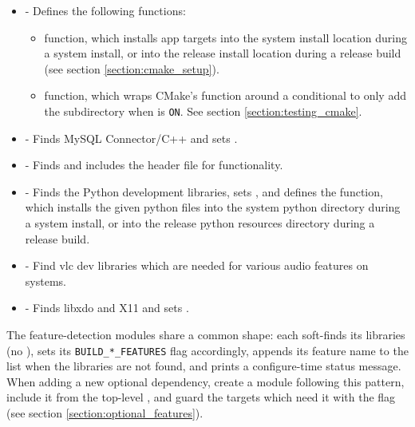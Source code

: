 \begin{itemize}\itemsep0em
	\item {} - Defines the following functions:
		\begin{itemize}\itemsep0em
			\item {} function, which installs app targets into the system install location during a system install, or into the release install location during a release build (see section \ref{section:cmake_setup}).
			\item {} function, which wraps CMake's  function around a conditional to only add the subdirectory when  is \texttt{ON}. See section \ref{section:testing_cmake}.
		\end{itemize}
	\item {} - Finds MySQL Connector/C++ and sets .
	\item {} - Finds and includes the  header file for  functionality.
	\item {} - Finds the Python development libraries, sets , and defines the  function, which installs the given python files into the system python directory during a system install, or into the release python resources directory during a release build.
	\item {} - Find vlc dev libraries which are needed for various audio features on  systems.
	\item {} - Finds libxdo and X11 and sets .
\end{itemize}

The feature-detection modules share a common shape: each soft-finds its libraries (no ), sets its \texttt{BUILD\_*\_FEATURES} flag accordingly, appends its feature name to the  list when the libraries are not found, and prints a configure-time status message. When adding a new optional dependency, create a module following this pattern, include it from the top-level , and guard the targets which need it with the flag (see section \ref{section:optional_features}).
















